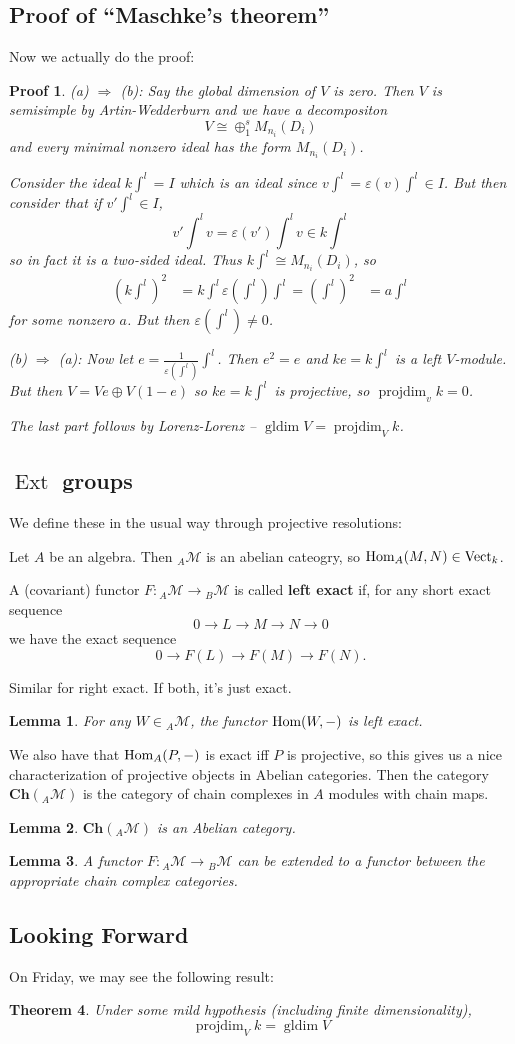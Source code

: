 \documentclass[12pt]{article}
\theoremstyle{break}
\theoremstyle{nonumberbreak}
\theoremstyle{changebreak}
\newtheorem{thm}{Theorem}[subsection]
\newtheorem{lem}[thm]{Lemma}
\theoremstyle{break}
\theoremstyle{nonumberbreak}
\newtheorem{prf}{Proof}
\theoremstyle{nonumberplain}
\theoremstyle{change}
\DeclareMathOperator{\Ext}{Ext}
\DeclareMathOperator{\gldim}{gldim}
\DeclareMathOperator{\projdim}{projdim}
\newcommand*{\Hom}{\ensuremath\text{Hom}}
\newcommand*{\Vectk}{\operatorname{Vect}_k}
\newcommand*{\calM}{\mathcal{M}}
\newcommand*{\Ch}{\mathbf{Ch}}
\begin{document}
\subsection{Proof of ``Maschke's theorem''}
Now we actually do the proof:
\begin{prf}
	(a) $\Rightarrow$ (b): Say the global dimension of $V$ is zero. Then $V$ is semisimple by Artin-Wedderburn and we have a decompositon
	\[V\cong \oplus_1^s M_{n_i}(D_i)\]
	and every minimal nonzero ideal has the form $M_{n_i}(D_i)$.

	Consider the ideal $k\int^l=I$ which is an ideal since $v\int^l=\varepsilon(v)\int^l\in I$. But then consider that if $v'\int^l\in I$, 
	\[v'\int^l v=\varepsilon(v')\int^l v\in k\int^l\]
	so in fact it is a two-sided ideal. Thus $k\int^l\cong M_{n_i}(D_i)$, so 
	\begin{align*}
		(k\int^l)^2&=k\int^l
		\varepsilon(\int^l)\int^l=(\int^l)^2&=a\int^l
	\end{align*}
	for some nonzero $a$. But then $\varepsilon(\int^l)\ne 0$.

	(b) $\Rightarrow$ (a): Now let $e=\frac{1}{\varepsilon(\int^l)}\int^l$. Then $e^2=e$ and $ke=k\int^l$ is a left $V$-module.
	But then $V=Ve\oplus V(1-e)$ so $ke=k\int^l$ is projective, so $\projdim_v k=0$.

	The last part follows by Lorenz-Lorenz -- $\gldim V=\projdim_V k$.
\end{prf}

\subsection{$\Ext$ groups}
We define these in the usual way through projective resolutions:

Let $A$ be an algebra. Then $_A\calM$ is an abelian cateogry, so $\Hom_A(M,N)\in\Vectk$.
\begin{defn}
	A (covariant) functor $F:{_A\calM}\to{_B\calM}$ is called \textbf{left exact} if, for any short exact sequence
	\[0\to L\to M\to N\to 0\]
	we have the exact sequence
	\[0\to F(L)\to F(M)\to F(N).\]

	Similar for right exact. If both, it's just exact.
\end{defn}
\begin{lem}
	For any $W\in{_A\calM}$, the functor $\Hom(W,-)$ is left exact.
\end{lem}
We also have that $\Hom_A(P,-)$ is exact iff $P$ is projective, so this gives us a nice characterization of projective objects in Abelian categories.
Then the category $\Ch({_A\calM})$ is the category of chain complexes in $A$ modules with chain maps.
\begin{lem}
	$\Ch({_A\calM})$ is an Abelian category.
\end{lem}
\begin{lem}
	A functor $F:{_A\calM}\to{_B\calM}$ can be extended to a functor between the appropriate chain complex categories.
\end{lem}

\subsection{Looking Forward}
On Friday, we may see the following result:
\begin{thm}
	Under some mild hypothesis (including finite dimensionality),
	\[\projdim_V k=\gldim V\]
\end{thm}
\end{document}
